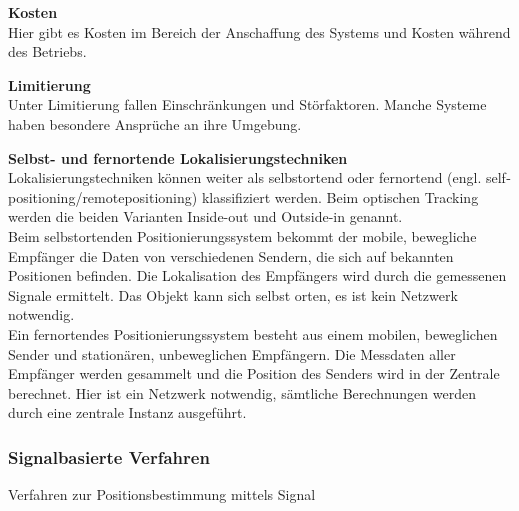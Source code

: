     \textbf{Kosten}\\
    Hier gibt es Kosten im Bereich der Anschaffung des Systems und Kosten während des Betriebs.

    \textbf{Limitierung}\\
    Unter Limitierung fallen Einschränkungen und Störfaktoren. Manche Systeme haben besondere Ansprüche an ihre Umgebung.

    \textbf{Selbst- und fernortende Lokalisierungstechniken}\\
    Lokalisierungstechniken können weiter als selbstortend oder fernortend (engl. self­positioning/remote­positioning) klassifiziert werden. Beim optischen Tracking werden die beiden Varianten Inside-out und Outside-in genannt.\\
    Beim selbstortenden Positionierungssystem bekommt der mobile, bewegliche Empfänger die Daten von verschiedenen Sendern, die sich auf bekannten Positionen befinden. Die Lokalisation des Empfängers wird durch die gemessenen Signale ermittelt. Das Objekt kann sich selbst orten, es ist kein Netzwerk notwendig.\\
    Ein fernortendes Positionierungssystem besteht aus einem mobilen, beweglichen Sender und stationären, unbeweglichen Empfängern. Die Messdaten aller Empfänger werden gesammelt und die Position des Senders wird in der Zentrale berechnet. Hier ist ein Netzwerk notwendig, sämtliche Berechnungen werden durch eine zentrale Instanz ausgeführt.

    \subsubsection{Signalbasierte Verfahren}

    Verfahren zur Positionsbestimmung mittels Signal \cite{pos_signal_2} \cite{pos_signal_4}
    
